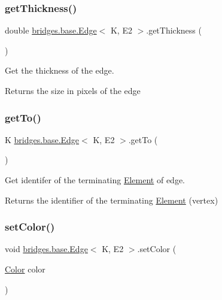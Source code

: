 \subsubsection{\texorpdfstring{get\+Thickness()}{getThickness()}}
{\footnotesize\ttfamily double \hyperlink{classbridges_1_1base_1_1_edge}{bridges.\+base.\+Edge}$<$ K, E2 $>$.get\+Thickness (\begin{DoxyParamCaption}{ }\end{DoxyParamCaption})}



Get the thickness of the edge. 

\begin{DoxyReturn}{Returns}
the size in pixels of the edge 
\end{DoxyReturn}
\mbox{\label{classbridges_1_1base_1_1_edge_ab451c13aa8173b5ef1cc2b2dd4f8508f}} 
\subsubsection{\texorpdfstring{get\+To()}{getTo()}}
{\footnotesize\ttfamily K \hyperlink{classbridges_1_1base_1_1_edge}{bridges.\+base.\+Edge}$<$ K, E2 $>$.get\+To (\begin{DoxyParamCaption}{ }\end{DoxyParamCaption})}



Get identifer of the terminating \hyperlink{classbridges_1_1base_1_1_element}{Element} of edge. 

\begin{DoxyReturn}{Returns}
the identifier of the terminating \hyperlink{classbridges_1_1base_1_1_element}{Element} (vertex) 
\end{DoxyReturn}
\mbox{\label{classbridges_1_1base_1_1_edge_a77f6d36e94a3cbb8e478c85a1a6dad84}} 
\subsubsection{\texorpdfstring{set\+Color()}{setColor()}\hspace{0.1cm}{\footnotesize\ttfamily [1/3]}}
{\footnotesize\ttfamily void \hyperlink{classbridges_1_1base_1_1_edge}{bridges.\+base.\+Edge}$<$ K, E2 $>$.set\+Color (\begin{DoxyParamCaption}\item[{\hyperlink{classbridges_1_1base_1_1_color}{Color}}]{color }\end{DoxyParamCaption})}



